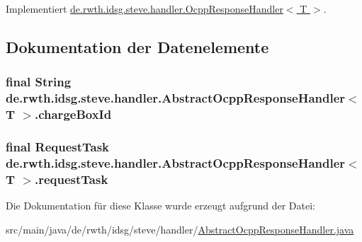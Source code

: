 Implementiert \hyperlink{interfacede_1_1rwth_1_1idsg_1_1steve_1_1handler_1_1_ocpp_response_handler_3_01_t_01_4_a59c104903f611fc1968ab3ebd87c7d7a}{de.\-rwth.\-idsg.\-steve.\-handler.\-Ocpp\-Response\-Handler$<$ T $>$}.



\subsection{Dokumentation der Datenelemente}
\hypertarget{classde_1_1rwth_1_1idsg_1_1steve_1_1handler_1_1_abstract_ocpp_response_handler_3_01_t_01_4_a8c07bdb598803efe236906c96a8d21a6}{
\subsubsection[{charge\-Box\-Id}]{\setlength{\rightskip}{0pt plus 5cm}final String de.\-rwth.\-idsg.\-steve.\-handler.\-Abstract\-Ocpp\-Response\-Handler$<$ T $>$.charge\-Box\-Id\hspace{0.3cm}{\ttfamily [protected]}}}\label{classde_1_1rwth_1_1idsg_1_1steve_1_1handler_1_1_abstract_ocpp_response_handler_3_01_t_01_4_a8c07bdb598803efe236906c96a8d21a6}
\hypertarget{classde_1_1rwth_1_1idsg_1_1steve_1_1handler_1_1_abstract_ocpp_response_handler_3_01_t_01_4_afbad6820ded6580e25792d7a4b893465}{
\subsubsection[{request\-Task}]{\setlength{\rightskip}{0pt plus 5cm}final {\bf Request\-Task} de.\-rwth.\-idsg.\-steve.\-handler.\-Abstract\-Ocpp\-Response\-Handler$<$ T $>$.request\-Task\hspace{0.3cm}{\ttfamily [protected]}}}\label{classde_1_1rwth_1_1idsg_1_1steve_1_1handler_1_1_abstract_ocpp_response_handler_3_01_t_01_4_afbad6820ded6580e25792d7a4b893465}


Die Dokumentation für diese Klasse wurde erzeugt aufgrund der Datei\-:\begin{DoxyCompactItemize}
\item 
src/main/java/de/rwth/idsg/steve/handler/\hyperlink{_abstract_ocpp_response_handler_8java}{Abstract\-Ocpp\-Response\-Handler.\-java}\end{DoxyCompactItemize}
